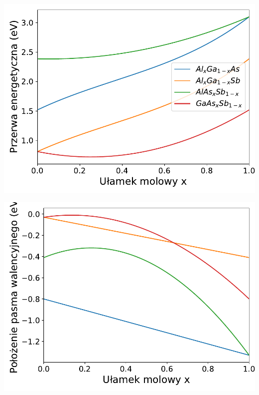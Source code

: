 \documentclass[12pt,openany,a4paper]{book}
\begin{document}
\begin{minipage}[t]{0.5\textwidth}
	\includegraphics[width = \linewidth]{Figures/ternary/eg.pdf}\label{fig:ter_Eg}
\end{minipage}
\begin{minipage}[t]{0.5\textwidth}
	\includegraphics[width = \linewidth]{Figures/ternary/vbo.pdf}\label{fig:ter_vbo}
\end{minipage}
\end{document}
